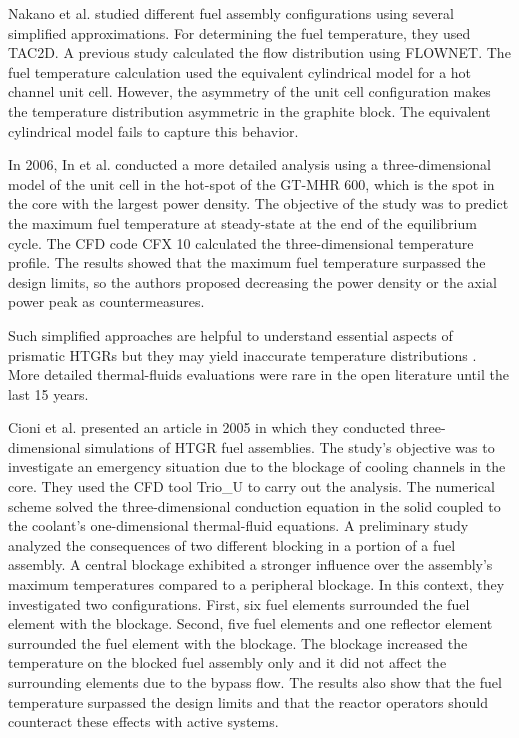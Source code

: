 Nakano et al. \cite{nakano_conceptual_2008} studied different fuel assembly configurations using several simplified approximations.
For determining the fuel temperature, they used TAC2D.
A previous study calculated the flow distribution using FLOWNET.
The fuel temperature calculation used the equivalent cylindrical model for a hot channel unit cell.
However, the asymmetry of the unit cell configuration makes the temperature distribution asymmetric in the graphite block.
The equivalent cylindrical model fails to capture this behavior.

In 2006, In et al. \cite{in_three-dimensional_2006} conducted a more detailed analysis using a three-dimensional model of the unit cell in the hot-spot of the GT-MHR 600, which is the spot in the core with the largest power density.
The objective of the study was to predict the maximum fuel temperature at steady-state at the end of the equilibrium cycle.
The CFD code CFX 10 \cite{ansys_inc_cfx_2006} calculated the three-dimensional temperature profile.
The results showed that the maximum fuel temperature surpassed the design limits, so the authors proposed decreasing the power density or the axial power peak as countermeasures.

Such simplified approaches are helpful to understand essential aspects of prismatic HTGRs but they may yield inaccurate temperature distributions \cite{tak_numerical_2008}.
More detailed thermal-fluids evaluations were rare in the open literature until the last 15 years.

Cioni et al. \cite{cioni_3d_2005} presented an article in 2005 in which they conducted three-dimensional simulations of HTGR fuel assemblies.
The study's objective was to investigate an emergency situation due to the blockage of cooling channels in the core.
They used the \gls{CFD} tool Trio\_U \cite{bieder_priceles_2000} to carry out the analysis.
The numerical scheme solved the three-dimensional conduction equation in the solid coupled to the coolant's one-dimensional thermal-fluid equations.
A preliminary study analyzed the consequences of two different blocking in a portion of a fuel assembly.
A central blockage exhibited a stronger influence over the assembly's maximum temperatures compared to a peripheral blockage.
In this context, they investigated two configurations.
First, six fuel elements surrounded the fuel element with the blockage.
Second, five fuel elements and one reflector element surrounded the fuel element with the blockage.
The blockage increased the temperature on the blocked fuel assembly only and it did not affect the surrounding elements due to the bypass flow.
The results also show that the fuel temperature surpassed the design limits and that the reactor operators should counteract these effects with active systems.

